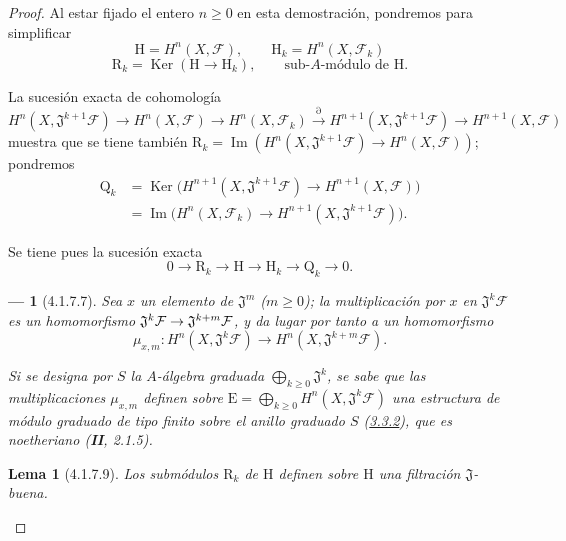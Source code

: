 \documentclass[10pt,oneside,openany]{book}
\theoremstyle{egaenv}\newtheorem*{env}{---}
\theoremstyle{egastatement}
\newtheorem*{lemma}{Lema}
\theoremstyle{egadescription}
\renewcommand{\geq}{\geqslant}
\renewcommand{\to}{\mathchoice{\longrightarrow}{\rightarrow}{\rightarrow}{\rightarrow}}
\begin{document}
\begin{proof}
Al estar fijado el entero $n\geq0$ en esta demostración, pondremos para
simplificar
\[
\mathrm H=H^n(X,\mathcal F),\qquad
\mathrm H_k=H^n(X,\mathcal F_k)
\tag{4.1.7.3}\label{III.4.1.7.3-fr}
\]
\[
\mathrm R_k=\operatorname{Ker}(\mathrm H\longrightarrow\mathrm H_k),
\qquad\text{sub-$A$-módulo de $\mathrm H$.}
\tag{4.1.7.4}\label{III.4.1.7.4-fr}
\]

La sucesión exacta de cohomología
\[
H^n(X,\mathfrak J^{k+1}\mathcal F)\longrightarrow H^n(X,\mathcal F)
\longrightarrow H^n(X,\mathcal F_k)\xrightarrow{\partial}
H^{n+1}(X,\mathfrak J^{k+1}\mathcal F)
\longrightarrow H^{n+1}(X,\mathcal F)
\]
muestra que se tiene también
$\mathrm R_k=\operatorname{Im}(
H^n(X,\mathfrak J^{k+1}\mathcal F)\longrightarrow H^n(X,\mathcal F)
)$;
pondremos
\[
\begin{aligned}
\mathrm Q_k
&=\operatorname{Ker}\bigl(H^{n+1}(X,\mathfrak J^{k+1}\mathcal F)
\longrightarrow H^{n+1}(X,\mathcal F)\bigr)\\
&=\operatorname{Im}\bigl(H^n(X,\mathcal F_k)
\longrightarrow H^{n+1}(X,\mathfrak J^{k+1}\mathcal F)\bigr).
\end{aligned}
\tag{4.1.7.5}\label{III.4.1.7.5-fr}
\]

Se tiene pues la sucesión exacta
\[
0\longrightarrow\mathrm R_k\longrightarrow\mathrm H
\longrightarrow\mathrm H_k\longrightarrow\mathrm Q_k\longrightarrow0.
\tag{4.1.7.6}\label{III.4.1.7.6-fr}
\]

\begin{env}[4.1.7.7]
\label{III.4.1.7.7-fr}
Sea $x$ un elemento de $\mathfrak J^m$ ($m\geq0$); la multiplicación por
$x$ en $\mathfrak J^k\mathcal F$ es un homomorfismo
$\mathfrak J^k\mathcal F\to\mathfrak J^{k+m}\mathcal F$, y da lugar
por tanto a un homomorfismo
\[
\mu_{x,m}:H^n(X,\mathfrak J^k\mathcal F)
\longrightarrow H^n(X,\mathfrak J^{k+m}\mathcal F).
\tag{4.1.7.8}\label{III.4.1.7.8-fr}
\]

Si se designa por $S$ la $A$-álgebra graduada
$\bigoplus_{k\geq0}\mathfrak J^k$, se sabe que las multiplicaciones
$\mu_{x,m}$ definen sobre
$\mathrm E=\bigoplus_{k\geq0}H^n(X,\mathfrak J^k\mathcal F)$ una
estructura de \emph{módulo graduado de tipo finito} sobre el anillo graduado $S$
(\hyperref[III.3.3.2-fr]{3.3.2}), que es \emph{noetheriano} (\textbf{II}, 2.1.5).
\end{env}

\begin{lemma}[4.1.7.9]
\label{III.4.1.7.9-fr}
Los submódulos $\mathrm R_k$ de $\mathrm H$ definen sobre $\mathrm H$
una filtración $\mathfrak J$-buena.
\end{lemma}


\end{proof}
\end{document}
